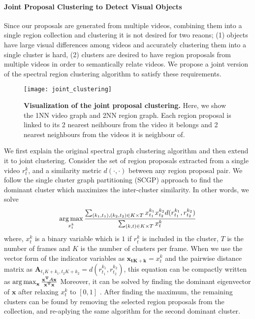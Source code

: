 \paragraph{Joint Proposal Clustering to Detect Visual Objects}
Since our proposals are generated from multiple videos, combining them into a single region collection and clustering it is not desired for two reaons; (1) objects have large visual differences among videos and accurately clustering them into a single cluster is hard, (2) clusters are desired to have region proposals from multiple videos in order to semantically relate videos. We propose a joint version of the spectral region clustering algorithm to satisfy these requirements.

\begin{figure}[ht]
  \texttt{[image: joint\_clustering]}
  \caption{\textbf{Visualization of the joint proposal clustering.} Here, we show the 1NN video graph and 2NN region graph. Each region proposal is linked to its 2 nearest neihbours from the video it belongs and 2 nearest neighbours from the videos it is neighbour of.}
  \label{hierProposal}
\end{figure}

We first explain the original spectral graph clustering algorithm and then extend it to joint clustering. Consider the set of region proposals extracted from a single video $r^k_t$, and a similarity metric $d(\cdot,\cdot)$ between any region proposal pair. We follow the single cluster graph partitioning (SCGP)\cite{scgp} approach to find the dominant cluster which maximizes the inter-cluster similarity. In other words, we solve
\begin{equation}
  \operatorname*{arg\,max}_{x^k_t} \frac{\sum_{(k_1,t_1),(k_2,t_2) \in K \times T} x^{k_1}_{t_1} x^{k_2}_{t_2} d(r^{k_1}_{t_1},r^{k_2}_{t_2})}{\sum_{(k,t) \in K \times T} x^{k}_t}
\end{equation}
where, $x^{k}_t$ is a binary variable which is $1$ if $r^{k}_t$ is included in the cluster, $T$ is the number of frames and $K$ is the number of clusters per frame. When we use the vector form of the indicator variables as $\mathbf{x_{tK+k}}=x^{k}_{t}$ and the pairwise distance matrix as $\mathbf{A}_{t_1K+k_1,t_2K+k_2}=d(r^{k_1}_{t_1},r^{k_2}_{t_2})$, this equation can be compactly written as
$\operatorname*{arg\,max}_{\mathbf{x}} \frac{\mathbf{x^T}A\mathbf{x}}{\mathbf{x^T}\mathbf{x}}$
Moreover, it can be solved by finding the dominant eigenvector of $\mathbf{x}$ after relaxing $x^{k}_t$ to $[0,1]$ \cite{scgp,scgp_eigen}. After finding the maximum, the remaining clusters can be found by removing the selected region proposals from the collection, and re-aplying the same algorithm for the second dominant cluster.

